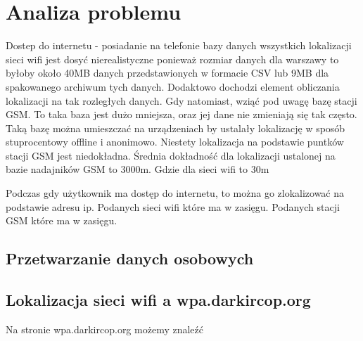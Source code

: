 \chapter{Analiza problemu}
Dostep do internetu - posiadanie na telefonie bazy danych wszystkich lokalizacji sieci wifi jest dosyć nierealistyczne ponieważ rozmiar danych dla warszawy to byłoby około 40MB danych przedstawionych w formacie CSV lub 9MB dla spakowanego archiwum tych danych. Dodaktowo dochodzi element obliczania lokalizacji na tak rozległych danych. Gdy natomiast, wziąć pod uwagę bazę stacji GSM. To taka baza jest dużo mniejsza, oraz jej dane nie zmieniają się tak często. Taką bazę można umieszczać na urządzeniach by ustalały lokalizację w sposób stuprocentowy offline i anonimowo. Niestety lokalizacja na podstawie puntków stacji GSM jest niedokładna. Średnia dokładność dla lokalizacji ustalonej na bazie nadajników GSM to 3000m. Gdzie dla sieci wifi to 30m


Podczas gdy użytkownik ma dostęp do internetu, to można go zlokalizować na podstawie adresu ip. Podanych sieci wifi które ma w zasięgu. Podanych stacji GSM które ma w zasięgu.

\section{Przetwarzanie danych osobowych}


\section{Lokalizacja sieci wifi a wpa.darkircop.org}
Na stronie wpa.darkircop.org możemy znaleźć 

